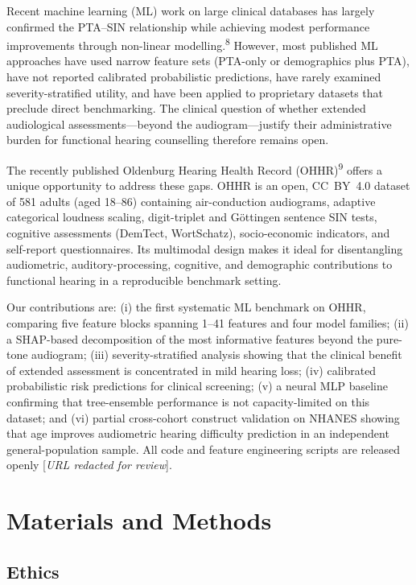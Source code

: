 \documentclass[12pt,a4paper]{article}
\begin{document}
Recent machine learning (ML) work on large clinical databases has largely
confirmed the PTA--SIN relationship while achieving modest performance
improvements through non-linear modelling.\textsuperscript{8}  However, most
published ML approaches have used narrow feature sets (PTA-only or
demographics plus PTA), have not reported calibrated probabilistic
predictions, have rarely examined severity-stratified utility, and have been
applied to proprietary datasets that preclude direct benchmarking.  The
clinical question of whether extended audiological assessments---beyond the
audiogram---justify their administrative burden for functional hearing
counselling therefore remains open.

The recently published Oldenburg Hearing Health Record
(OHHR)\textsuperscript{9} offers a unique opportunity to address these gaps.
OHHR is an open, CC~BY~4.0 dataset of 581 adults (aged 18--86) containing
air-conduction audiograms, adaptive categorical loudness scaling, digit-triplet
and Göttingen sentence SIN tests, cognitive assessments (DemTect, WortSchatz),
socio-economic indicators, and self-report questionnaires.  Its multimodal
design makes it ideal for disentangling audiometric, auditory-processing,
cognitive, and demographic contributions to functional hearing in a
reproducible benchmark setting.

Our contributions are: (i) the first systematic ML benchmark on OHHR,
comparing five feature blocks spanning 1--41 features and four model
families; (ii) a SHAP-based decomposition of the most informative features
beyond the pure-tone audiogram; (iii) severity-stratified analysis showing
that the clinical benefit of extended assessment is concentrated in mild
hearing loss; (iv) calibrated probabilistic risk predictions for clinical
screening; (v) a neural MLP baseline confirming that tree-ensemble
performance is not capacity-limited on this dataset; and (vi) partial
cross-cohort construct validation on NHANES showing that age improves
audiometric hearing difficulty prediction in an independent general-population
sample.  All code and feature engineering scripts are released openly
[\textit{URL redacted for review}].

\section{Materials and Methods}

\subsection{Ethics}
\end{document}
